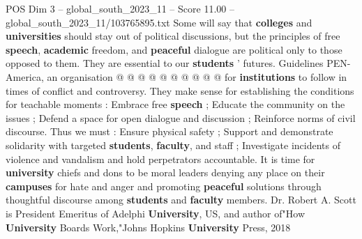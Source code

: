 \begin{textsample}{POS Dim 3 – global\_south\_2023\_11 – Score 11.00 – global\_south\_2023\_11/103765895.txt}
Some will say that \textbf{colleges} and \textbf{universities} should stay out of political discussions, but the principles of free \textbf{speech}, \textbf{academic} freedom, and \textbf{peaceful} dialogue are political only to those opposed to them.
They are essential to our \textbf{students} ' futures.
Guidelines PEN-America, an organisation @ @ @ @ @ @ @ @ @ @ for \textbf{institutions} to follow in times of conflict and controversy.
They make sense for establishing the conditions for teachable moments : Embrace free \textbf{speech} ; Educate the community on the issues ; Defend a space for open dialogue and discussion ; Reinforce norms of civil discourse.
Thus we must : Ensure physical safety ; Support and demonstrate solidarity with targeted \textbf{students}, \textbf{faculty}, and staff ; Investigate incidents of violence and vandalism and hold perpetrators accountable.
It is time for \textbf{university} chiefs and dons to be moral leaders denying any place on their \textbf{campuses} for hate and anger and promoting \textbf{peaceful} solutions through thoughtful discourse among \textbf{students} and \textbf{faculty} members.
Dr.
Robert A.
Scott is President Emeritus of Adelphi \textbf{University}, US, and author of"How \textbf{University} Boards Work,"Johns Hopkins \textbf{University} Press, 2018

\end{textsample}
